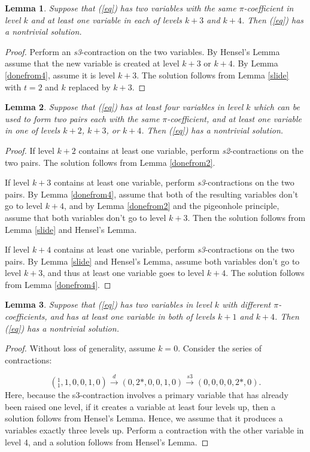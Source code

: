 \documentclass{article}
\newtheorem{lemma}{Lemma}
\begin{document}
\begin{lemma} \label{doneafters3}
Suppose that (\ref{eq}) has two variables with the same $\pi$-coefficient in level $k$ and at least one variable in each of levels $k+3$ and $k+4$.  Then (\ref{eq}) has a nontrivial solution.
\end{lemma}
\begin{proof}
Perform an \textit{s3}-contraction on the two variables.
By Hensel's Lemma assume that the new variable is created at level $k+3$ or $k+4$.
By Lemma \ref{donefrom4}, assume it is level $k+3$.
The solution follows from Lemma \ref{slide} with $t=2$ and $k$ replaced by $k+3$.
\end{proof}

\begin{lemma} \label{empty234}
Suppose that (\ref{eq}) has at least four variables in level $k$ which can be used to form two pairs each with the same $\pi$-coefficient, and at least one variable in one of levels $k+2$, $k+3$, or $k+4$.  Then (\ref{eq}) has a nontrivial solution.
\end{lemma}
\begin{proof}
If level $k+2$ contains at least one variable, perform \textit{s2}-contractions on the two pairs.  The solution follows from Lemma \ref{donefrom2}.

If level $k+3$ contains at least one variable, perform \textit{s3}-contractions on the two pairs.  By Lemma \ref{donefrom4}, assume that both of the resulting variables don't go to level $k+4$, and by Lemma \ref{donefrom2} and the pigeonhole principle, assume that both variables don't go to level $k+3$.  Then the solution follows from Lemma \ref{slide} and Hensel's Lemma.

If level $k+4$ contains at least one variable, perform \textit{s3}-contractions on the two pairs.  By Lemma \ref{slide} and Hensel's Lemma, assume both variables don't go to level $k+3$, and thus at least one variable goes to level $k+4$.  The solution follows from Lemma \ref{donefrom4}.
\end{proof}

\begin{lemma} \label{oneofempty14}
Suppose that (\ref{eq}) has two variables in level $k$ with different $\pi$-coefficients, and has at least one variable in both of levels $k+1$ and $k+4$.  Then (\ref{eq}) has a nontrivial solution.
\end{lemma}
\begin{proof}
Without loss of generality, assume $k=0$.  Consider the series of contractions:

$$({}^{1}_{1},1,0,0,1,0) \xrightarrow{d}
(0,2*,0,0,1,0) \xrightarrow{s3}
(0,0,0,0,2*,0).$$
Here, because the s3-contraction involves a primary variable that has already been raised one level, if it creates a variable at least four levels up, then a solution follows from Hensel's Lemma.  Hence, we assume that it produces a variables exactly three levels up.  Perform a contraction with the other variable in level 4, and a solution follows from Hensel's Lemma.
\end{proof}
\end{document}
